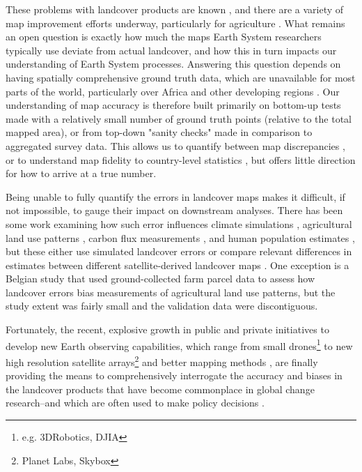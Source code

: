 \documentclass{pnastwo}
\begin{document}
\begin{article}
These problems with landcover products are known \cite{fritz_comparison_2010, fritz_cropland_2011, see_improved_2015, fritz_mapping_2015,verburg_challenges_2011}, and there are a variety of map improvement efforts underway, particularly for agriculture \cite{fritz_geo-wiki:_2012,estes_diylandcover:_2015}. What remains an open question is exactly how much the maps Earth System researchers typically use deviate from actual landcover, and how this in turn impacts our understanding of Earth System processes. Answering this question depends on having spatially comprehensive ground truth data, which are unavailable for most parts of the world, particularly over Africa and other developing regions \cite{see_improved_2015}. Our understanding of map accuracy is therefore built primarily on bottom-up tests made with a relatively small number of ground truth points (relative to the total mapped area), or from top-down "sanity checks" made in comparison to aggregated survey data. This allows us to quantify between map discrepancies  \cite[e.g.][]{fritz_comparison_2010, kaptue_tchuente_comparison_2011}, or to understand map fidelity to country-level statistics \cite[e.g.][]{fritz_comparison_2010}, but offers little direction for how to arrive at a true number.

Being unable to fully quantify the errors in landcover maps makes it difficult, if not impossible, to gauge their impact on downstream analyses. There has been some work examining how such error influences climate simulations \cite{ge_impacts_2007}, agricultural land use patterns \cite{schmit_limitations_2006}, carbon flux measurements \cite{quaife_impact_2008}, and human population estimates \cite{linard_assessing_2010}, but these either use simulated landcover errors \cite{ge_impacts_2007} or compare relevant differences in estimates between different satellite-derived landcover maps \cite{linard_assessing_2010, quaife_impact_2008}. One exception is a Belgian study \cite{schmit_limitations_2006} that used ground-collected farm parcel data to assess how landcover errors bias measurements of agricultural land use patterns, but the study extent was fairly small and the validation data were discontiguous. 

Fortunately, the recent, explosive growth in public and private initiatives to develop new Earth observing capabilities, which range from small drones\footnote{e.g. 3DRobotics, DJIA} to new high resolution satellite arrays\footnote{Planet Labs, Skybox} and better mapping methods \cite{fritz_geo-wiki:_2012,estes_projected_2013,debats_generalized_????}, are finally providing the means to comprehensively interrogate the accuracy and biases in the landcover products that have become commonplace in global change research--and which are often used to make policy decisions \cite{searchinger_high_2015}.  


\end{article}
\end{document}
